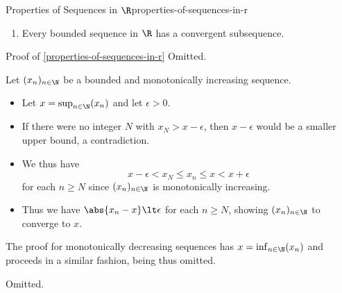 \begin{proposition}{Properties of Sequences in $\R$}{properties-of-sequences-in-r}
\begin{enumerate}
\begin{enumerate}
                    \[
                        \lim_{n\to\infty}(x_{n})%
                        =%
                        \inf_{n\in\N}(x_{n}),%
                    \]%
                    so in particular $(x_{n})_{n\in\N}$ converges.
            \end{enumerate}
        \item\label{properties-of-sequences-in-r-the-bolzano-weierstrass-theorem}Every bounded sequence in $\R$ has a convergent subsequence.
    \end{enumerate}
\end{proposition}
\begin{Proof}{Proof of \cref{properties-of-sequences-in-r}}%
    Omitted.

    Let $(x_{n})_{n\in\N}$ be a bounded and monotonically increasing sequence.
    \begin{itemize}
        \item Let $x=\sup_{n\in\N}(x_{n})$ and let $\epsilon\gt0$.
        \item If there were no integer $N$ with $x_{N}\gt x-\epsilon$, then $x-\epsilon$ would be a smaller upper bound, a contradiction.
        \item We thus have
            \[
                x-\epsilon%
                \lt%
                x_{N}%
                \leq%
                x_{n}%
                \leq%
                x%
                \lt%
                x+\epsilon%
            \]%
            for each $n\geq N$ since $(x_{n})_{n\in\N}$ is monotonically increasing.
        \item Thus we have $\abs{x_{n}-x}\lt\epsilon$ for each $n\geq N$, showing $(x_{n})_{n\in\N}$ to converge to $x$.
    \end{itemize}
    The proof for monotonically decreasing sequences has $x=\inf_{n\in\N}(x_{n})$ and proceeds in a similar fashion, being thus omitted.

    Omitted.
\end{Proof}
